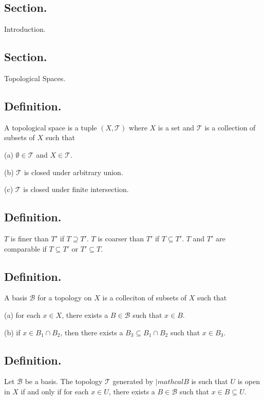 \documentclass[titlepage]{article}
\begin{document}
\maketitle

\tableofcontents

\newpage {}

\subsection{Section.} Introduction.

\newpage {}

\subsection{Section.} Topological Spaces.

\subsection{Definition.} A topological space is a tuple $(X, \mathcal{T})$ where $X$ is a set and $\mathcal{T}$ is a collection of subsets of $X$ such that 

(a) $\emptyset \in \mathcal{T}$ and $X \in \mathcal{T}$.

(b) $\mathcal{T}$ is closed under arbitrary union.

(c) $\mathcal{T}$ is closed under finite intersection.

\subsection{Definition.} $T$ is finer than $T'$ if $T \supseteq T'$. $T$ is coarser than $T'$ if $T \subseteq T'$. $T$ and $T'$ are comparable if $T \subseteq T'$ or $T' \subseteq T$.

\subsection{Definition.} A basis $\mathcal{B}$ for a topology on $X$ is a colleciton of subsets of $X$ such that 

(a) for each $x \in X$, there exists a $B \in \mathcal{B}$ such that $x \in B$.

(b) if $x \in B_{1} \cap B_{2}$, then there exists a $B_{3} \subseteq B_{1} \cap B_{2}$ such that $x \in B_{3}$.

\subsection{Definition.} Let $\mathcal{B}$ be a basis. The topology $\mathcal{T}$ generated by $|mathcal{B}$ is such that $U$ is open in $X$ if and only if for each $x \in U$, there exists a $B \in \mathcal{B}$ such that $x \in B \subseteq U$.
\end{document}
